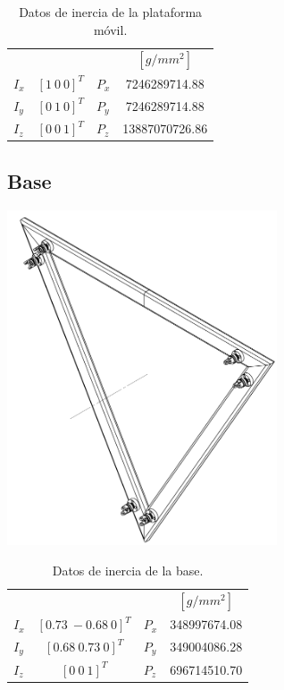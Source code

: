 \begin{table}[hb!]
 \begin{center}
\begin{tabular}{lclc}
 & & & $[g/mm^2]$\\
 $ I_x $ & $ [1 \ 0 \ 0]^T $ & $ P_x $ & 7246289714.88\\
 $ I_y $ & $ [0 \ 1 \ 0]^T $ & $ P_y $ & 7246289714.88\\
 $ I_z $ & $ [0 \ 0 \ 1]^T $ & $ P_z $ & 13887070726.86
\end{tabular}
\end{center}
\caption{Datos de inercia de la plataforma móvil.}
\label{tab: inertia table platform}
\end{table}


\subsection{Base}
\includegraphics[width=8cm]{03_Reporte/img/BASE.PNG}
% 

\begin{table}[hb!]
 \begin{center}
\begin{tabular}{lclc}
 & & & $[g/mm^2]$\\
 $ I_x $ & $ [0.73\ -0.68\ 0]^T $ & $ P_x $ & 348997674.08\\
 $ I_y $ & $ [0.68\ 0.73\ 0]^T $ & $ P_y $ & 349004086.28\\
 $ I_z $ & $ [0 \ 0 \ 1]^T $ & $ P_z $ & 696714510.70
\end{tabular}
\end{center}
\caption{Datos de inercia de la base.}
\label{tab: inertia table base}
\end{table}


